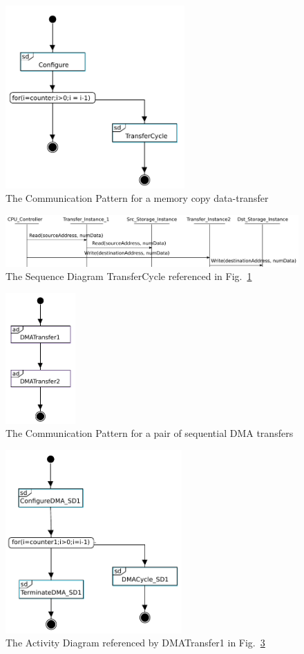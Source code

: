 \documentclass{llncs}
\begin{document}
\begin{figure}[!htbp]
	\centering
	\includegraphics[height=7cm]{figures/evaluation/MemCopy.pdf}
    \caption{The Communication Pattern for a memory copy data-transfer}
	\label{fig:MemoryCopy}
\end{figure}
%
\begin{figure}[!htbp]
	\centering
	\includegraphics[width=\textwidth]{figures/evaluation/MemCopy_TransferCycle.pdf}
    \caption{The Sequence Diagram TransferCycle referenced in Fig.~\ref{fig:MemoryCopy}}
	\label{fig:MemoryCopy_TransferCycle}
\end{figure}
%
\begin{figure}[!htbp]
	\centering
	\includegraphics[height=5cm]{figures/evaluation/DoubleDMATransfer.pdf}
  \caption{The Communication Pattern for a pair of sequential DMA transfers}
	\label{fig:DoubleDMATransfer}
\end{figure}
%
\begin{figure}[!htbp]
	\centering
	\includegraphics[height=7cm]{figures/evaluation/DMATransfer1.pdf}
  \caption{The Activity Diagram referenced by DMATransfer1 in Fig.~\ref{fig:DoubleDMATransfer}}
	\label{fig:DMATransfer1}
\end{figure}
\end{document}
